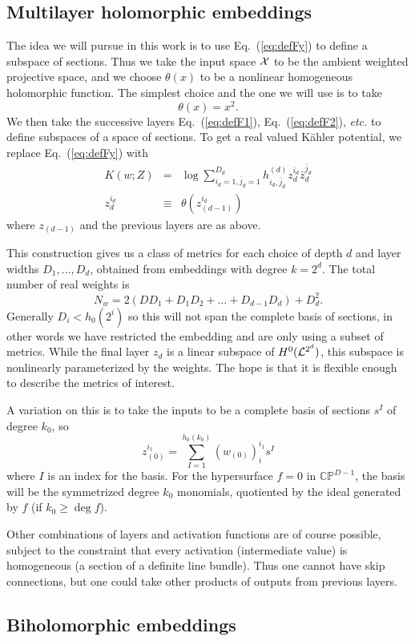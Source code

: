 \documentclass[12pt]{article}
\def\IC{\mathbb{C}}
\def\IP{\mathbb{P}}
\def\CL {{\cal L}}
\def\CX {{\cal X}}
\newcommand{\eq}[1]{Eq.~(\ref{eq:#1})}
\newcommand{\be}{\begin{equation}}
\newcommand{\ee}{\end{equation}}
\newcommand{\bea}{\begin{eqnarray}}
\newcommand{\eea}{\end{eqnarray}}
\def\bz{\bar{z}}
\def\bj{{\bar{j}}}
\def\bz{\bar{z}}
\begin{document}
\subsection{ Multilayer holomorphic embeddings }

The idea we will pursue in this work is to use \eq{defFy} to define a subspace of sections.
Thus we take the input space $\CX$ to be the ambient weighted projective space, and we choose
$\theta(x)$ to be a nonlinear homogeneous holomorphic function.  
The simplest choice and the one we will use is to take
\be \label{eq:deftheta}
\theta(x) = x^2 .
\ee
We then take the successive layers \eq{defF1}, \eq{defF2}, {\it etc.} to define subspaces of a space of
sections. 
To get a real valued K\"ahler potential, we replace \eq{defFy} with
\bea \label{eq:defFK}
K(w;Z) &=&  \log\sum_{i_d=1,\bj_d=1}^{D_d} h^{(d)}_{i_d,\bj_d} z_d^{i_d} \bz_{d}^{\bj_d} \\
z_d^{i_d} &\equiv& \theta( z_{(d-1)}^{i_d} ) 
\eea
where $z_{(d-1)}$ and the previous layers are as above.

This construction gives us a class of metrics for each choice of depth $d$ and layer widths $D_1,\ldots,D_d$,
obtained from embeddings with degree  $k=2^d$.  The total number of real weights is
\be
N_w = 2\left( D D_1 + D_1 D_2 + \ldots + D_{d-1} D_d \right) + D_d^2 .
\ee
Generally $D_i < h_0(2^i)$ so this will not span the complete basis of sections, in other words
we have restricted the embedding and are only using a subset of metrics.  While the final layer $z_d$ is a linear
subspace of $H^0(\CL^{2^d})$, this subspace is nonlinearly parameterized by the weights.
The hope is that it is flexible enough to describe the metrics of interest.

A variation on this is to take the inputs to be a complete basis of sections $s^I$ of degree $k_0$, so
\be  \label{eq:defF2}
 z_{(0)}^{i_1} = \sum_{I=1}^{h_0(k_0)} (w_{(0)})^{i_1}_i s^I 
\ee
where $I$ is an index for the basis.  For the hypersurface $f=0$ in $\IC\IP^{D-1}$, the basis will be the symmetrized 
degree $k_0$ monomials, quotiented by the ideal generated by $f$ (if $k_0 \ge \deg f$).

Other combinations of layers and activation functions are of course possible, subject to the constraint
that every activation (intermediate value) is homogeneous (a section of a definite line bundle).
Thus one cannot have skip connections, but one could take other products of outputs from previous layers.

\subsection{ Biholomorphic embeddings }
\end{document}
